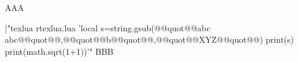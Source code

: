 

AAA

|"texlua rtexlua.lua  'local s=string.gsub(@@quot@@abc abc@@quot@@,@@quot@@b@@quot@@,@@quot@@XYZ@@quot@@) print(s) print(math.sqrt(1+1))'"
BBB

\bye